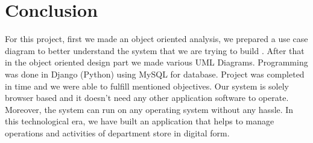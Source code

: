 \section{Conclusion}

For this project, first we made an object oriented analysis, we prepared a use
case diagram to better understand the system that we are trying to build .
After that in the object oriented design part we made various UML Diagrams.
Programming was done in Django (Python) using MySQL for database. Project was
completed in time and we were able to fulfill mentioned objectives. Our system
is solely browser based and it doesn’t need any other application software to
operate. Moreover, the system can run on any operating system without any
hassle. In this technological era, we have built an application that helps to
manage operations and activities of department store in digital form.

